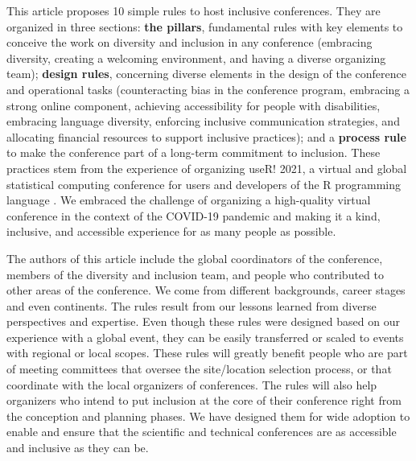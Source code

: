 \documentclass[10pt,letterpaper]{article}
\begin{document}
This article proposes 10 simple rules to host inclusive conferences.
They are organized in three sections: \textbf{the pillars}, fundamental rules with key elements to conceive the work on diversity and inclusion in any conference (embracing diversity, creating a welcoming environment, and having a diverse organizing team); \textbf{design rules}, concerning diverse elements in the design of the conference and operational tasks (counteracting bias in the conference program, embracing a strong online component, achieving accessibility for people with disabilities, embracing language diversity, enforcing inclusive communication strategies, and allocating financial resources to support inclusive practices); and a \textbf{process rule} to make the conference part of a long-term commitment to inclusion. 
These practices stem from the experience of organizing useR! 2021, a virtual and global statistical computing conference for users and developers of the R programming language \cite{r_core_team_2021}.
We embraced the challenge of organizing a high-quality virtual conference in the context of the COVID-19 pandemic and making it a kind, inclusive, and accessible experience for as many people as possible.

The authors of this article include the global coordinators of the conference, members of the diversity and inclusion team, and people who contributed to other areas of the conference. We come from different backgrounds, career stages and even continents.
The rules result from our lessons learned from diverse perspectives and expertise. 
Even though these rules were designed based on our experience with a global event, they can be easily transferred or scaled to events with regional or local scopes.
These rules will greatly benefit people who are part of meeting committees that oversee the site/location selection process, or that coordinate with the local organizers of conferences.
The rules will also help organizers who intend to put inclusion at the core of their conference right from the conception and planning phases. We have designed them for wide adoption to enable and ensure that the scientific and technical conferences are as accessible and inclusive as they can be.
\end{document}
